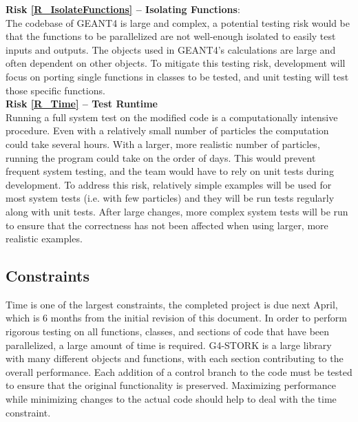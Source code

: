 \documentclass[12pt]{article}
\begin{document}
\textbf{Risk \ref{R_IsolateFunctions} -- Isolating Functions}:\\
The codebase of GEANT4 is large and complex, a potential testing risk would be that the functions to be parallelized are not well-enough isolated to easily test inputs and outputs. The objects used in GEANT4's calculations are large and often dependent on other objects. To mitigate this testing risk, development will focus on porting single functions in classes to be tested, and unit testing will test those specific functions.\\

\newpage
\textbf{Risk \ref{R_Time} -- Test Runtime}\\
Running a full system test on the modified code is a computationally intensive procedure. Even with a relatively small number of particles the computation could take several hours. With a larger, more realistic number of particles, running the program could take on the order of days. This would prevent frequent system testing, and the team would have to rely on unit tests during development. To address this risk, relatively simple examples will be used for most system tests (i.e. with few particles) and they will be run tests regularly along with unit tests. After large changes, more complex system tests will be run to ensure that the correctness has not been affected when using larger, more realistic examples.

\subsection{Constraints} %
Time is one of the largest constraints, the completed project is due next April, which is 6 months from the initial revision of this document. In order to perform rigorous testing on all functions, classes, and sections of code that have been parallelized, a  large amount of time is required. G4-STORK is a large library with many different objects and functions, with each section contributing to the overall performance. Each addition of a control branch to the code must be tested to ensure that the original functionality is preserved. Maximizing performance while minimizing changes to the actual code should help to deal with the time constraint.


\end{document}
